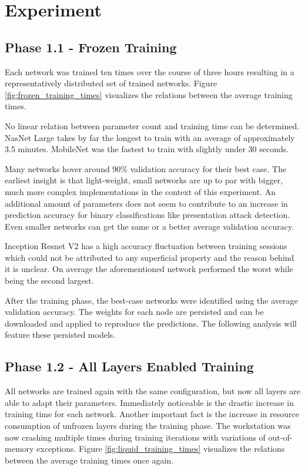 
\section{Experiment}
\subsection{Phase 1.1 - Frozen Training}

Each network was trained ten times over the course of three hours resulting in a representatively distributed set of trained networks.
Figure \ref{fig:frozen_training_times} visualizes the relations between the average training times.



No linear relation between parameter count and training time can be determined.
NasNet Large takes by far the longest to train with an average of approximately 3.5 minutes. 
MobileNet was the fastest to train with slightly under 30 seconds.





Many networks hover around 90\% validation accuracy for their best case.
The earliest insight is that light-weight, small networks are up to par with bigger, much more complex implementations in the context of this experiment.
An additional amount of parameters does not seem to contribute to an increase in prediction accuracy for binary classifications like presentation attack detection.
Even smaller networks can get the same or a better average validation accuracy.

Inception Resnet V2 has a high accuracy fluctuation between training sessions which could not be attributed to any superficial property and the reason behind it is unclear.
On average the aforementioned network performed the worst while being the second largest.

After the training phase, the best-case networks were identified using the average validation accuracy.
The weights for each node are persisted and can be downloaded and applied to reproduce the predictions.
The following analysis will feature these persisted models.


\subsection{Phase 1.2 - All Layers Enabled Training}
All networks are trained again with the same configuration, but now all layers are able to adapt their parameters.
Immediately noticeable is the drastic increase in training time for each network.
Another important fact is the increase in resource consumption of unfrozen layers during the training phase.
The workstation was now crashing multiple times during training iterations with variations of out-of-memory exceptions.
Figure \ref{fig:liquid_training_times} visualizes the relations between the average training times once again.


